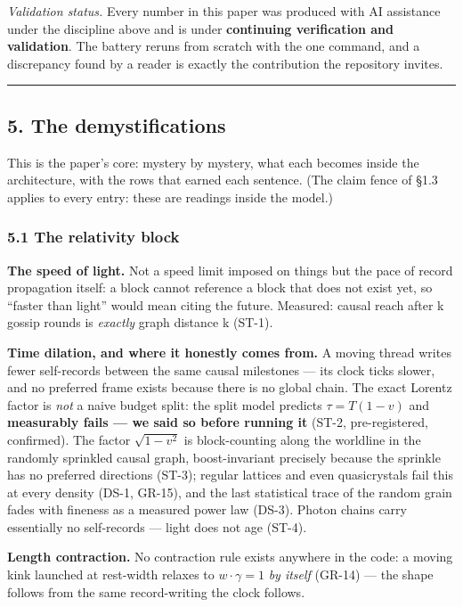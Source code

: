 \documentclass[
  11pt,
]{article}
\begin{document}
\emph{Validation status.} Every number in this paper was produced with
AI assistance under the discipline above and is under \textbf{continuing
verification and validation}. The battery reruns from scratch with the
one command, and a discrepancy found by a reader is exactly the
contribution the repository invites.

\begin{center}\rule{0.5\linewidth}{0.5pt}\end{center}

\subsection{5. The demystifications}\label{the-demystifications}

This is the paper's core: mystery by mystery, what each becomes inside
the architecture, with the rows that earned each sentence. (The claim
fence of \S{}1.3 applies to every entry: these are readings inside the
model.)

\subsubsection{5.1 The relativity block}\label{the-relativity-block}

\textbf{The speed of light.} Not a speed limit imposed on things but the
pace of record propagation itself: a block cannot reference a block that
does not exist yet, so ``faster than light'' would mean citing the
future. Measured: causal reach after k gossip rounds is \emph{exactly}
graph distance k (ST-1).

\textbf{Time dilation, and where it honestly comes from.} A moving
thread writes fewer self-records between the same causal milestones ---
its clock ticks slower, and no preferred frame exists because there is
no global chain. The exact Lorentz factor is \emph{not} a naive budget
split: the split model predicts $\tau = T(1-v)$ and \textbf{measurably fails
--- we said so before running it} (ST-2, pre-registered, confirmed). The
factor $\sqrt{1-v^2}$ is block-counting along the worldline in the randomly
sprinkled causal graph, boost-invariant precisely because the sprinkle
has no preferred directions (ST-3); regular lattices and even
quasicrystals fail this at every density (DS-1, GR-15), and the last
statistical trace of the random grain fades with fineness as a measured
power law (DS-3). Photon chains carry essentially no self-records ---
light does not age (ST-4).

\textbf{Length contraction.} No contraction rule exists anywhere in the
code: a moving kink launched at rest-width relaxes to $w\cdot\gamma = 1$ \emph{by
itself} (GR-14) --- the shape follows from the same record-writing the
clock follows.
\end{document}
